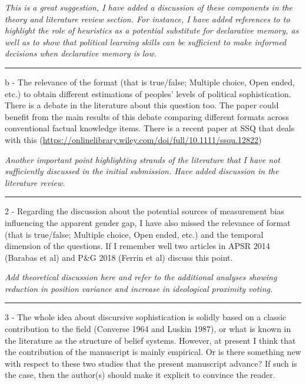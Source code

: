 \textit{This is a great suggestion, I have added a discussion of these components in the theory and literature review section. For instance, I have added references to \citet{lupia1994shortcuts} to highlight the role of heuristics as a potential substitute for declarative memory, as well as \citep{prior2008money} to show that political learning skills can be sufficient to make informed decisions when declarative memory is low.}


\rule{\linewidth}{.01cm}

b - The relevance of the format (that is true/false; Multiple choice, Open ended, etc.) to obtain different estimations of peoples' levels of political sophistication. There is a debate in the literature about this question too. The paper could benefit from the main results of this debate comparing different formats across conventional factual knowledge items. There is a recent paper at SSQ that deals with this (\url{https://onlinelibrary.wiley.com/doi/full/10.1111/ssqu.12822})

\textit{Another important point highlighting strands of the literature that I have not sufficiently discussed in the initial submission. Have added discussion in the literature review.}


\rule{\linewidth}{.01cm}

2 - Regarding the discussion about the potential sources of measurement bias influencing the apparent gender gap, I have also missed the relevance of format (that is true/false; Multiple choice, Open ended, etc.) and the temporal dimension of the questions. If I remember well two articles in APSR 2014 (Barabas et al) and P\&G 2018 (Ferrin et al) discuss this point.

\textit{Add theoretical discussion here and refer to the additional analyses showing reduction in position variance and increase in ideological proximity voting.}


\rule{\linewidth}{.01cm}

3 - The whole idea about discursive sophistication is solidly based on a classic contribution to the field (Converse 1964 and Luskin 1987), or what is known in the literature as the structure of belief systems. However, at present I think that the contribution of the manuscript is mainly empirical. Or is there something new with respect to these two studies that the present manuscript advance? If such is the case, then the author(s) should make it explicit to convince the reader.

